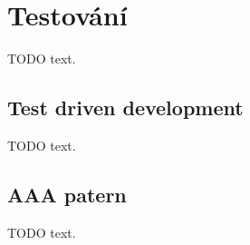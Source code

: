 \section{Testování}

TODO text.

\subsection{Test driven development}

TODO text.

\subsection{AAA patern}

TODO text.
